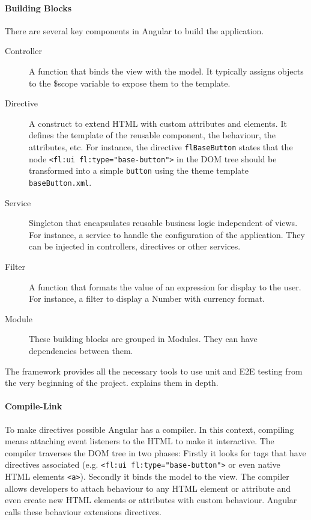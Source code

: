 \paragraph{Building Blocks} There are several key components in Angular to build the application.

\begin{description}
    \item[Controller] A function that binds the view with the model. It typically assigns objects to the \$scope variable to expose them to the template.
    \item[Directive] A construct to extend HTML with custom attributes and elements. It defines the template of the reusable component, the behaviour, the attributes, etc. For instance, the directive \texttt{flBaseButton} states that the node \lstinline$<fl:ui fl:type="base-button">$ in the \ac{DOM} tree should be transformed into a simple \texttt{button} using the theme template \texttt{baseButton.xml}. 
    \item[Service] Singleton that encapsulates reusable business logic independent of views. For instance, a service to handle the configuration of the application. They can be injected in controllers, directives or other services.
    \item[Filter] A function that formats the value of an expression for display to the user. For instance, a filter to display a Number with currency format.
    \item[Module] These building blocks are grouped in Modules. They can have dependencies between them.
\end{description}

The framework provides all the necessary tools to use unit and \ac{E2E} testing from the very beginning of the project. 
 explains them in depth.
    
\paragraph{Compile-Link} To make directives possible Angular has a compiler.
In this context, compiling means attaching event listeners to the \ac{HTML} to make it interactive.
The compiler traverses the \ac{DOM} tree in two phases:
Firstly it looks for tags that have directives associated (e.g. \lstinline$<fl:ui fl:type="base-button">$ or even native \ac{HTML} elements \lstinline$<a>$).
Secondly it binds the model to the view.
The compiler allows developers to attach behaviour to any \ac{HTML} element or attribute and even create new HTML elements or attributes with custom behaviour.
Angular calls these behaviour extensions directives.

